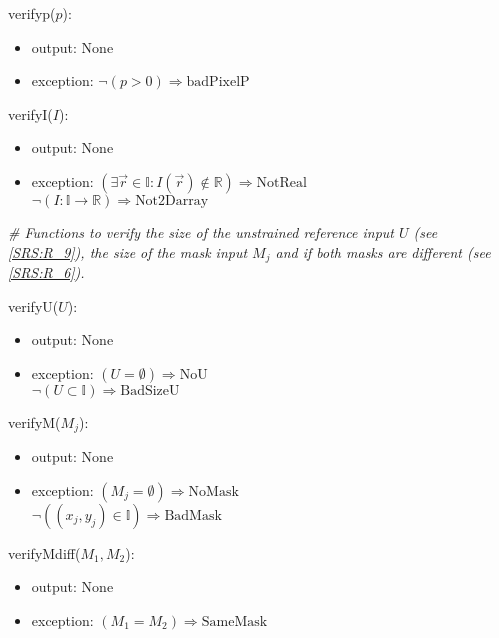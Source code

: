 \documentclass[12pt, titlepage]{article}
\begin{document}
\noindent verifyp($p$):
\begin{itemize}
\item output: None
\item exception:\newline
$\neg (p > 0 )\Rightarrow \text{badPixelP}$
\end{itemize}
\bigskip

\noindent verifyI($I$):
\begin{itemize}
\item output: None
\item exception:\newline
$(\exists \vec{r} \in \mathbb{I}: I(\vec{r}) \notin \mathbb{R}) \Rightarrow 
\text{NotReal}$\\
$\neg(I:\mathbb{I} \rightarrow \mathbb{R})\Rightarrow \text{Not2Darray}$
\end{itemize}
\bigskip

\noindent\textit{{\#} Functions to verify the size of the unstrained reference 
input $U$ (see \cref{SRS:R_9}), the size of the mask input $M_j$ and if both 
masks are different (see \cref{SRS:R_6}).}
\medskip

\noindent verifyU($U$):
\begin{itemize}
\item output: None
\item exception:\newline
$(U=\emptyset)\Rightarrow\text{NoU}$\\
$\neg (U \subset \mathbb{I}) \Rightarrow \text{BadSizeU}$
\end{itemize}
\bigskip

\noindent verifyM($M_j$):
\begin{itemize}
\item output: None
\item exception:\newline
$(M_j=\emptyset)\Rightarrow\text{NoMask}$\\
$\neg((x_j,y_j) \in \mathbb{I})\Rightarrow \text{BadMask}$\\
\end{itemize}
\bigskip

\noindent verifyMdiff($M_1,M_2$):
\begin{itemize}
\item output: None
\item exception:\newline
$(M_1=M_2)\Rightarrow\text{SameMask}$
\end{itemize}
\bigskip
\end{document}
